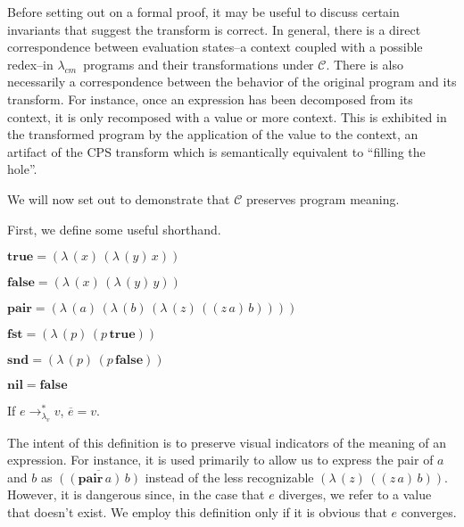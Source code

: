 \documentclass[ms,electronic,twosidetoc,letterpaper,chaptercenter,parttop]{byumsphd}
\newcommand{\cm}{$\lambda_{cm}$}
\newcommand{\true}{\mathbf{true}}
\newcommand{\false}{\mathbf{false}}
\newcommand{\nil}{\mathbf{nil}}
\newcommand{\pair}[2]{((\mathbf{pair}\,#1)\,#2)}
\newcommand{\eval}[1]{\overline{#1}}
\newcommand{\lvrrs}{\rightarrow_{\lambda_v}^{*}}
\newcommand{\abs}[2]{(\lambda\,(#1)\,#2)}
\newcommand{\app}[2]{(#1\,#2)}
\begin{document}
Before setting out on a formal proof, it may be useful to discuss certain invariants that
suggest the transform is correct. In general, there is a direct correspondence between
evaluation states--a context coupled with a possible redex--in \cm\ programs and their
transformations under $\mathcal{C}$. There is also necessarily a correspondence between
the behavior of the original program and its transform. For instance, once an expression
has been decomposed from its context, it is only recomposed with a value or more context.
This is exhibited in the transformed program by the application of the value to the
context, an artifact of the CPS transform which is semantically equivalent to ``filling
the hole''.

We will now set out to demonstrate that $\mathcal{C}$ preserves program meaning.

First, we define some useful shorthand.





\begin{defn}
$\true=\abs{x}{\abs{y}{x}}$
\end{defn}

\begin{defn}
$\false=\abs{x}{\abs{y}{y}}$
\end{defn}

\begin{defn}
$\mathbf{pair}=\abs{a}{\abs{b}{\abs{z}{\app{\app{z}{a}}{b}}}}$
\end{defn}

\begin{defn}
$\mathbf{fst}=\abs{p}{\app{p}{\true}}$
\end{defn}

\begin{defn}
$\mathbf{snd}=\abs{p}{\app{p}{\false}}$
\end{defn}

\begin{defn}
$\nil=\false$
\end{defn}

\begin{defn}
If $e\lvrrs v$, $\eval{e}=v$.

The intent of this definition is to preserve visual indicators of the meaning of an
expression. For instance, it is used primarily to allow us to express the pair of $a$ and
$b$ as $\eval{\pair{a}{b}}$ instead of the less recognizable
$\abs{z}{\app{\app{z}{a}}{b}}$. However, it is dangerous since, in the case that $e$
diverges, we refer to a value that doesn't exist. We employ this definition only if it is
obvious that $e$ converges.
\end{defn}
\end{document}

